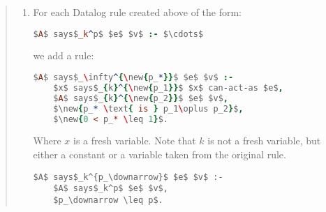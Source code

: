 \begin{quotation}
\begin{enumerate}
  Then the assertion \lstinline!$A$ says $f_0$ if $f_1\cdots f_m$, c, with probability $p$! is translated into a set of $n+1$ Datalog rules as follows.
  
  \begin{enumerate}
  \item 
    We add the Datalog rule:
    \begin{lstlisting}[language=Prolog]
$A$ says$_k^{\new{p_*}}$ $f^\prime_0$ :-
    $x$ says$_k^{\new{p_1}}$ $f_1\cdots$ $A$ says$_k^{\new{p_m}}$ $f_m$, c,
    $\new{p_\Sigma \text{ is } p_1 \oplus \cdots \oplus p_n}$, 
    $\new{0 < p_{lim} \leq p_\Sigma}$.
    \end{lstlisting}
    Where $k$ is a fresh variable, .

  \item
    For each $i\in\left\{1\cdots n\right\}$, we add a Datalog rule
    \begin{lstlisting}[language=Prolog]
$A$ says$_\infty^{\new{p_*}}$ $f^\prime_i$ :-
    $x$ says$_{D_{i-1}}^{\new{p_1}}$ $f^\prime_i$,
    $A$ says$_{\infty}^{\new{p_2}}$ $x$ can-say $D_{i-1}$ $f^\prime_i$,
    $\new{p_* \text{ is } p_1\oplus p_2}$, 
    $\new{0 < p_* \leq 1}$.
    \end{lstlisting}
    Where $x$ is a fresh variable.
  \end{enumerate}
  
  \item
    For each Datalog rule created above of the form:
    \begin{lstlisting}[language=Prolog]
      $A$ says$_k^p$ $e$ $v$ :- $\cdots$
    \end{lstlisting}
    we add a rule:

    \begin{lstlisting}[language=Prolog]
$A$ says$_\infty^{\new{p_*}}$ $e$ $v$ :-
    $x$ says$_{k}^{\new{p_1}}$ $x$ can-act-as $e$,
    $A$ says$_{k}^{\new{p_2}}$ $e$ $v$,
    $\new{p_* \text{ is } p_1\oplus p_2}$, 
    $\new{0 < p_* \leq 1}$.
    \end{lstlisting} Where $x$ is a fresh variable.  Note that $k$ is
not a fresh variable, but either a constant or a variable taken from
the original rule.
    

      
      \begin{lstlisting}[basicstyle=\color{BrickRed}\ttfamily]
$A$ says$_k^{p_\downarrow}$ $e$ $v$ :- 
    $A$ says$_k^p$ $e$ $v$,
    $p_\downarrow \leq p$.
      \end{lstlisting}
\end{enumerate}
\end{quotation}
